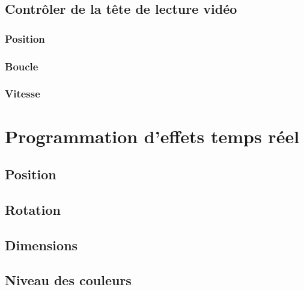\documentclass[
]{book}
\begin{document}
\hypertarget{contruxf4ler-de-la-tuxeate-de-lecture-viduxe9o}{%
\subsection{Contrôler de la tête de lecture vidéo}\label{contruxf4ler-de-la-tuxeate-de-lecture-viduxe9o}}

\hypertarget{position}{%
\subsubsection{Position}\label{position}}

\hypertarget{boucle}{%
\subsubsection{Boucle}\label{boucle}}

\hypertarget{vitesse}{%
\subsubsection{Vitesse}\label{vitesse}}

\hypertarget{programmation-deffets-temps-ruxe9el}{%
\section{Programmation d'effets temps réel}\label{programmation-deffets-temps-ruxe9el}}

\hypertarget{position-1}{%
\subsection{Position}\label{position-1}}

\hypertarget{rotation}{%
\subsection{Rotation}\label{rotation}}

\hypertarget{dimensions}{%
\subsection{Dimensions}\label{dimensions}}

\hypertarget{niveau-des-couleurs}{%
\subsection{Niveau des couleurs}\label{niveau-des-couleurs}}
\end{document}
